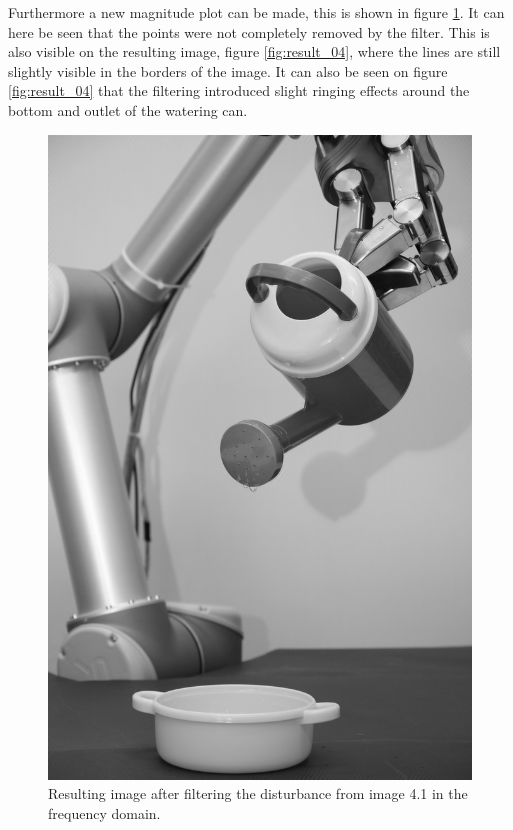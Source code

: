 Furthermore a new magnitude plot can be made, this is shown in figure \ref{fig:result_freq_04}.
It can here be seen that the points were not completely removed by the filter.
This is also visible on the resulting image, figure \ref{fig:result_04}, where the lines are still slightly visible in the borders of the image.
It can also be seen on figure \ref{fig:result_04} that the filtering introduced slight ringing effects around the bottom and outlet of the watering can.


\begin{figure}[H]
\centering
\includegraphics[width = \fullImageWidth]{../code/images/image_result_04.png}
\caption{Resulting image after filtering the disturbance from image 4.1 in the frequency domain.}
\label{fig:result_freq_04}
\end{figure}
